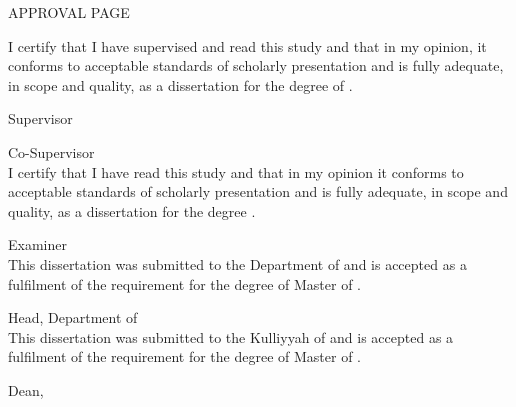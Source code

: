 \documentclass[12pt, a4paper]{memoir}
\begin{document}
\thispagestyle{empty}

\begin{Large}
\begin{center}
\MakeUppercase{Approval Page}
\end{center}
\end{Large}
\vspace{24pt}
I certify that I have supervised and read this study and that in my opinion, it 
conforms to acceptable standards of scholarly presentation and is fully 
adequate, in scope and quality, as a dissertation for the degree of \myDegree.
\\[24pt]

\hfill \makebox[2in]{\dotfill}

\hfill \mySupervisor

\hfill Supervisor
\\[24pt]

\hfill \makebox[2in]{\dotfill}

\hfill \myCoSupervisor

\hfill Co-Supervisor\\[24pt]

\noindent I certify that I have read this study and that in my opinion it 
conforms to acceptable standards of scholarly presentation and is fully 
adequate, in scope and quality, as a dissertation for the degree 
\myDegree.\\[24pt]

\hfill \makebox[2in]{\dotfill}

\hfill \myExaminer

\hfill Examiner\\[24pt]

\noindent This dissertation was submitted to the Department of \myDepartment 
and is 
accepted as a fulfilment of the requirement for the degree of Master of 
\mySubject.\\[24pt]

\hfill \makebox[2in]{\dotfill}

\hfill \myDepartmentHead

\hfill Head, Department of \myDepartment\\[24pt]

\noindent This dissertation was submitted to the Kulliyyah of \myKulliyah and 
is accepted as a fulfilment of the requirement for the degree of Master of 
\mySubject.\\[24pt]

\hfill \makebox[2in]{\dotfill}

\hfill \myKulliyahDean

\hfill Dean, \myKulliyah\\[24pt]
\end{document}

